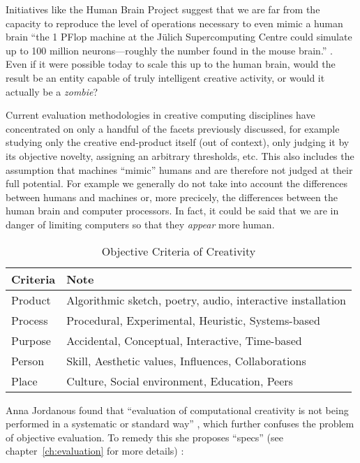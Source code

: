 \begin{leftbar}
Initiatives like the Human Brain Project suggest that we are far from the capacity to reproduce the level of operations necessary to even mimic a human brain ``the 1 PFlop machine at the J{\"u}lich Supercomputing Centre could simulate up to 100 million neurons---roughly the number found in the mouse brain.'' \autocite{Walker2012}. Even if it were possible today to scale this up to the human brain, would the result be an entity capable of truly intelligent creative activity, or would it actually be a \textit{zombie}?

Current evaluation methodologies in creative computing disciplines have concentrated on only a handful of the facets previously discussed, for example studying only the creative end-product itself (out of context), only judging it by its objective novelty, assigning an arbitrary thresholds, etc. This also includes the assumption that machines ``mimic'' humans and are therefore not judged at their full potential. For example we generally do not take into account the differences between humans and machines or, more precicely, the differences between the human brain and computer processors. In fact, it could be said that we are in danger of limiting computers so that they \textit{appear} more human.

\begin{table}
\renewcommand{\arraystretch}{1.3}
\caption{Objective Criteria of Creativity}
\label{table_objcreat}
\centering
\begin{tabular}{ll}
\hline
\bfseries Criteria & \bfseries Note \\
\hline\hline
Product & Algorithmic sketch, poetry, audio, interactive installation\\
Process & Procedural, Experimental, Heuristic, Systems-based\\
Purpose & Accidental, Conceptual, Interactive, Time-based\\
Person & Skill, Aesthetic values, Influences, Collaborations\\
Place & Culture, Social environment, Education, Peers\\
\hline
\end{tabular}
\end{table}

\end{leftbar}

\spirals

Anna Jordanous found that ``evaluation of computational creativity is not being performed in a systematic or standard way'' \autocite[p.2]{Jordanous2011}, which further confuses the problem of objective evaluation. To remedy this she proposes ``\gls{specs}'' (see chapter~\ref{ch:evaluation} for more details) \autocite[p.137-140]{Jordanous2012a}:

